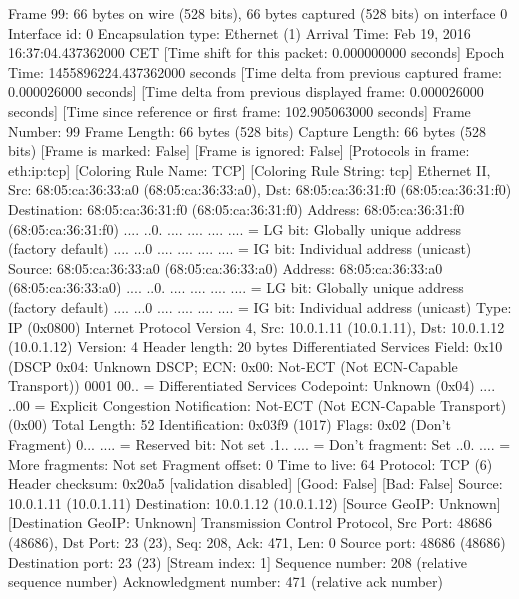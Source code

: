 Frame 99: 66 bytes on wire (528 bits), 66 bytes captured (528 bits) on interface 0
    Interface id: 0
    Encapsulation type: Ethernet (1)
    Arrival Time: Feb 19, 2016 16:37:04.437362000 CET
    [Time shift for this packet: 0.000000000 seconds]
    Epoch Time: 1455896224.437362000 seconds
    [Time delta from previous captured frame: 0.000026000 seconds]
    [Time delta from previous displayed frame: 0.000026000 seconds]
    [Time since reference or first frame: 102.905063000 seconds]
    Frame Number: 99
    Frame Length: 66 bytes (528 bits)
    Capture Length: 66 bytes (528 bits)
    [Frame is marked: False]
    [Frame is ignored: False]
    [Protocols in frame: eth:ip:tcp]
    [Coloring Rule Name: TCP]
    [Coloring Rule String: tcp]
Ethernet II, Src: 68:05:ca:36:33:a0 (68:05:ca:36:33:a0), Dst: 68:05:ca:36:31:f0 (68:05:ca:36:31:f0)
    Destination: 68:05:ca:36:31:f0 (68:05:ca:36:31:f0)
        Address: 68:05:ca:36:31:f0 (68:05:ca:36:31:f0)
        .... ..0. .... .... .... .... = LG bit: Globally unique address (factory default)
        .... ...0 .... .... .... .... = IG bit: Individual address (unicast)
    Source: 68:05:ca:36:33:a0 (68:05:ca:36:33:a0)
        Address: 68:05:ca:36:33:a0 (68:05:ca:36:33:a0)
        .... ..0. .... .... .... .... = LG bit: Globally unique address (factory default)
        .... ...0 .... .... .... .... = IG bit: Individual address (unicast)
    Type: IP (0x0800)
Internet Protocol Version 4, Src: 10.0.1.11 (10.0.1.11), Dst: 10.0.1.12 (10.0.1.12)
    Version: 4
    Header length: 20 bytes
    Differentiated Services Field: 0x10 (DSCP 0x04: Unknown DSCP; ECN: 0x00: Not-ECT (Not ECN-Capable Transport))
        0001 00.. = Differentiated Services Codepoint: Unknown (0x04)
        .... ..00 = Explicit Congestion Notification: Not-ECT (Not ECN-Capable Transport) (0x00)
    Total Length: 52
    Identification: 0x03f9 (1017)
    Flags: 0x02 (Don't Fragment)
        0... .... = Reserved bit: Not set
        .1.. .... = Don't fragment: Set
        ..0. .... = More fragments: Not set
    Fragment offset: 0
    Time to live: 64
    Protocol: TCP (6)
    Header checksum: 0x20a5 [validation disabled]
        [Good: False]
        [Bad: False]
    Source: 10.0.1.11 (10.0.1.11)
    Destination: 10.0.1.12 (10.0.1.12)
    [Source GeoIP: Unknown]
    [Destination GeoIP: Unknown]
Transmission Control Protocol, Src Port: 48686 (48686), Dst Port: 23 (23), Seq: 208, Ack: 471, Len: 0
    Source port: 48686 (48686)
    Destination port: 23 (23)
    [Stream index: 1]
    Sequence number: 208    (relative sequence number)
    Acknowledgment number: 471    (relative ack number)
